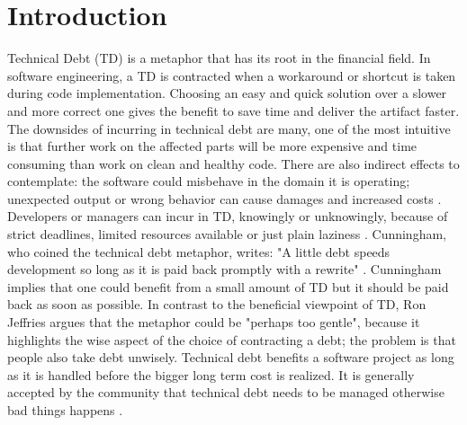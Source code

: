 \chapter{Introduction}
Technical Debt (TD) is a metaphor that has its root in the financial field. In software engineering, a TD is contracted when a workaround or shortcut is taken during code implementation.
Choosing an easy and quick solution over a slower and more correct one gives the benefit to save time and deliver the artifact faster. %
%
The downsides of incurring in technical debt are many, one of the most intuitive is that further work on the affected parts will be more expensive and time consuming than work on clean and healthy code. There are also indirect effects to contemplate: the software could misbehave in the domain it is operating; unexpected output or wrong behavior can cause damages and increased costs \cite{tom2013exploration}.
%
Developers or managers can incur in TD, knowingly or unknowingly, because of strict deadlines, limited resources available or just plain laziness \cite{hinsen2015technical,allman2012managing}. Cunningham, who coined the technical debt metaphor, writes: "A little debt speeds development so long as it is paid back promptly with a rewrite" \cite{cunningham1992wycash}. Cunningham implies that one could benefit from a small amount of TD but it should be paid back as soon as possible. 
%
In contrast to the beneficial viewpoint of TD, Ron Jeffries argues that the metaphor could be "perhaps too gentle", because it highlights the wise aspect of the choice of contracting a debt; the problem is that people also take debt unwisely. 
Technical debt benefits a software project as long as it is handled before the bigger long term cost is realized.
%
It is generally accepted by the community that technical debt needs to be managed otherwise bad things happens \cite{guo2016exploring} \cite{hinsen2015technical} \cite{allman2012managing} \cite{martini2018technical}. 

